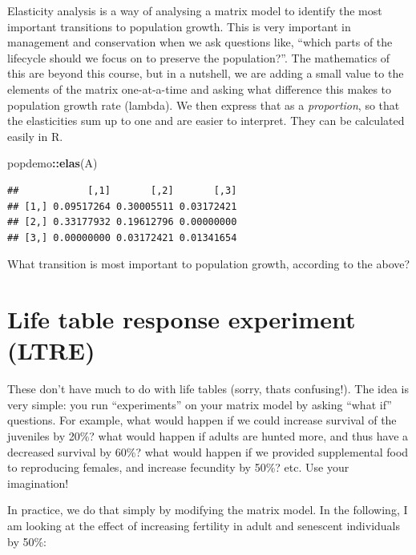 \documentclass[
  a4paper]{book}
\newenvironment{Shaded}{\begin{snugshade}}{\end{snugshade}}
\newcommand{\FunctionTok}[1]{\textcolor[rgb]{0.13,0.29,0.53}{\textbf{#1}}}
\newcommand{\NormalTok}[1]{#1}
\newcommand{\SpecialCharTok}[1]{\textcolor[rgb]{0.81,0.36,0.00}{\textbf{#1}}}
\begin{document}
Elasticity analysis is a way of analysing a matrix model to identify the most important transitions to population growth. This is very important in management and conservation when we ask questions like, ``which parts of the lifecycle should we focus on to preserve the population?''. The mathematics of this are beyond this course, but in a nutshell, we are adding a small value to the elements of the matrix one-at-a-time and asking what difference this makes to population growth rate (lambda). We then express that as a \emph{proportion}, so that the elasticities sum up to one and are easier to interpret. They can be calculated easily in R.

\begin{Shaded}
\begin{Highlighting}[]
\NormalTok{popdemo}\SpecialCharTok{::}\FunctionTok{elas}\NormalTok{(A)}
\end{Highlighting}
\end{Shaded}

\begin{verbatim}
##            [,1]       [,2]       [,3]
## [1,] 0.09517264 0.30005511 0.03172421
## [2,] 0.33177932 0.19612796 0.00000000
## [3,] 0.00000000 0.03172421 0.01341654
\end{verbatim}

What transition is most important to population growth, according to the above?

\section{Life table response experiment (LTRE)}\label{life-table-response-experiment-ltre}

These don't have much to do with life tables (sorry, thats confusing!). The idea is very simple: you run ``experiments'' on your matrix model by asking ``what if'' questions. For example, what would happen if we could increase survival of the juveniles by 20\%? what would happen if adults are hunted more, and thus have a decreased survival by 60\%? what would happen if we provided supplemental food to reproducing females, and increase fecundity by 50\%? etc. Use your imagination!

In practice, we do that simply by modifying the matrix model. In the following, I am looking at the effect of increasing fertility in adult and senescent individuals by 50\%:
\end{document}
